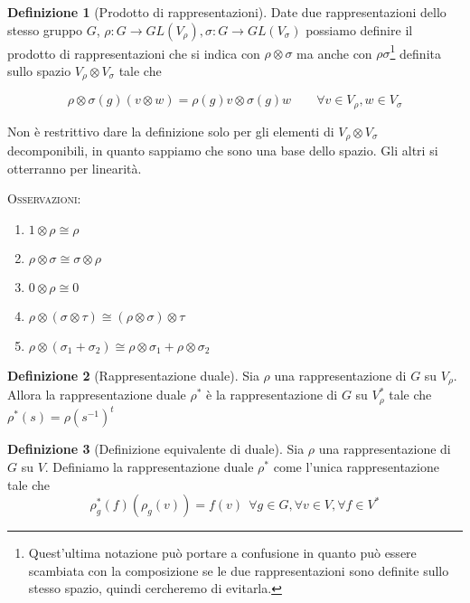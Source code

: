 \documentclass[11pt]{article}
\theoremstyle{plain}
\theoremstyle{definition}
\newtheorem{defn}{Definizione}[section]
\theoremstyle{remark}
\begin{document}
\begin{defn}[Prodotto di rappresentazioni]
  Date due rappresentazioni dello stesso gruppo $G$, $\rho: G \to GL(V_\rho), \sigma: G \to GL(V_\sigma)$ possiamo definire il prodotto di rappresentazioni che si indica con $\rho \otimes \sigma$  ma anche con $\rho\sigma$\footnote{Quest'ultima notazione può portare a confusione in quanto può essere scambiata con la composizione se le due rappresentazioni sono definite sullo stesso spazio, quindi cercheremo di evitarla.} definita sullo spazio $V_\rho \otimes V_\sigma$ tale che

  \[ \rho \otimes \sigma(g) (v \otimes w) = \rho(g) v \otimes \sigma(g) w \qquad \forall v \in V_\rho, w \in V_\sigma\]

  Non è restrittivo dare la definizione solo per gli elementi di $V_\rho \otimes V_\sigma$ decomponibili, in quanto sappiamo che sono una base dello spazio. Gli altri si otterranno per linearità.
  
\label{defn:prodotto di rappresentazioni}
\end{defn}


\textsc{Osservazioni:}


\begin{enumerate}
\item $1\otimes \rho \cong \rho$
\item $\rho \otimes \sigma \cong \sigma \otimes \rho$
\item $0 \otimes \rho \cong 0$
\item $\rho \otimes (\sigma \otimes \tau) \cong (\rho \otimes \sigma)\otimes \tau$
\item $\rho \otimes (\sigma_1 + \sigma_2) \cong \rho \otimes \sigma_1 + \rho \otimes \sigma_2$

\end{enumerate}





\begin{defn}[Rappresentazione duale]
Sia $\rho$ una rappresentazione di $G$ su $V_\rho$. Allora la rappresentazione duale $\rho^*$ è la rappresentazione di $G$ su $V_\rho ^*$ tale che $\rho^*(s)=\rho(s^{-1})^t$
\label{defn:rappresentazione duale}
\end{defn}

\begin{defn}[Definizione equivalente di duale]
Sia $\rho$ una rappresentazione di $G$ su $V$. Definiamo la rappresentazione duale $\rho^*$ come l'unica rappresentazione tale che
\[\rho_g^*(f)(\rho_g(v))=f(v)\ \ \forall g\in G,\forall v\in V,\forall f\in V^*\]
\end{defn}
\end{document}
